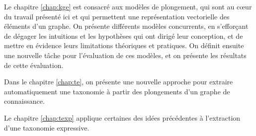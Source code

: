 Le chapitre \ref{chap:kge} est consacré aux modèles de plongement, qui sont au cœur du travail présenté ici et qui permettent une représentation vectorielle des éléments d'un graphe. On présente différents modèles concurrents, en s'efforçant de dégager les intuitions et les hypothèses qui ont dirigé leur conception, et de mettre en évidence leurs limitations théoriques et pratiques. On définit ensuite une nouvelle tâche pour l'évaluation de ces modèles, et on présente les résultats de cette évaluation.

Dans le chapitre \ref{chap:te}, on présente une nouvelle approche pour extraire automatiquement une taxonomie à partir des plongements d'un graphe de connaissance.

Le chapitre \ref{chap:texp} applique certaines des idées précédentes à l'extraction d'une taxonomie expressive. 
\clearpage
